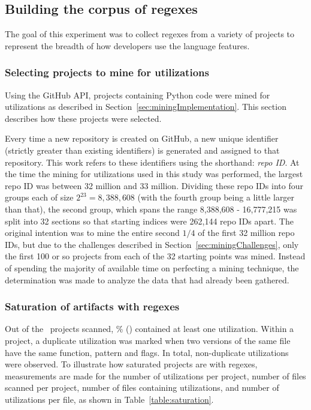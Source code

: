\subsection{Building the corpus of regexes}
\label{sec:corpusBuilding}

The goal of this experiment was to collect regexes from a variety of projects to represent the breadth of how developers use the language features.

\subsubsection{Selecting projects to mine for utilizations}
Using the GitHub API,  projects containing Python code were mined for utilizations as described in Section~\ref{sec:miningImplementation}.  This section describes how these projects were selected.

Every time a new repository is created on GitHub, a new unique identifier (strictly greater than existing identifiers) is generated and assigned to that repository.  This work refers to these identifiers using the shorthand: \emph{repo ID}.  At the time the mining for utilizations used in this study was performed, the largest repo ID was between 32 million and 33 million.  Dividing these repo IDs into four groups each of size $2^{23} = 8,388,608$ (with the fourth group being a little larger than that), the second group, which spans the range 8,388,608 - 16,777,215 was split into 32 sections so that starting indices were 262,144 repo IDs apart.  The original intention was to mine the entire second $1/4$ of the first 32 million repo IDs, but due to the challenges described in Section~\ref{sec:miningChallenges}, only the first 100 or so projects from each of the 32 starting points was mined.  Instead of spending the majority of available time on perfecting a mining technique, the determination was made to analyze the data that had already been gathered.



\subsubsection{Saturation of artifacts with regexes}
Out of the \ projects scanned, \% () contained at least one utilization.  Within a project, a duplicate utilization was marked when two versions of the same file have the same function, pattern and flags.  In total,  non-duplicate utilizations were observed.  To illustrate how saturated projects are with regexes, measurements are made for the number of utilizations per project, number of files scanned per project, number of files containing utilizations, and number of utilizations  per file, as shown in Table~\ref{table:saturation}.

